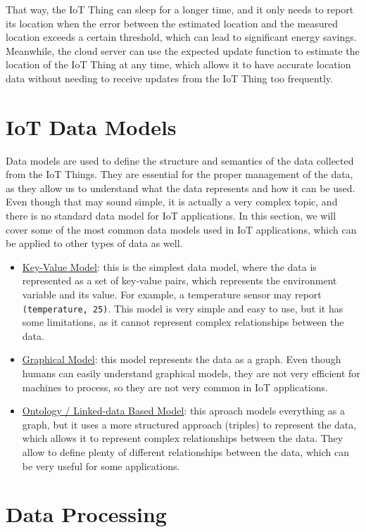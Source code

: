 That way, the IoT Thing can sleep for a longer time, and it only needs to report its location when the error between the estimated location and the measured location exceeds a certain threshold, which can lead to significant energy savings. Meanwhile, the cloud server can use the expected update function to estimate the location of the IoT Thing at any time, which allows it to have accurate location data without needing to receive updates from the IoT Thing too frequently.

\section{IoT Data Models}

Data models are used to define the structure and semantics of the data collected from the IoT Things. They are essential for the proper management of the data, as they allow us to understand what the data represents and how it can be used. Even though that may sound simple, it is actually a very complex topic, and there is no standard data model for IoT applications. In this section, we will cover some of the most common data models used in IoT applications, which can be applied to other types of data as well.
\begin{itemize}
    \item \ul{Key-Value Model}: this is the simplest data model, where the data is represented as a set of key-value pairs, which represents the environment variable and its value. For example, a temperature sensor may report \texttt{(temperature, 25)}. This model is very simple and easy to use, but it has some limitations, as it cannot represent complex relationships between the data.
    \item \ul{Graphical Model}: this model represents the data as a graph. Even though humans can easily understand graphical models, they are not very efficient for machines to process, so they are not very common in IoT applications.
    \item \ul{Ontology / Linked-data Based Model}: this aproach models everything as a graph, but it uses a more structured approach (triples) to represent the data, which allows it to represent complex relationships between the data. They allow to define plenty of different relationships between the data, which can be very useful for some applications.
\end{itemize}


\section{Data Processing}

